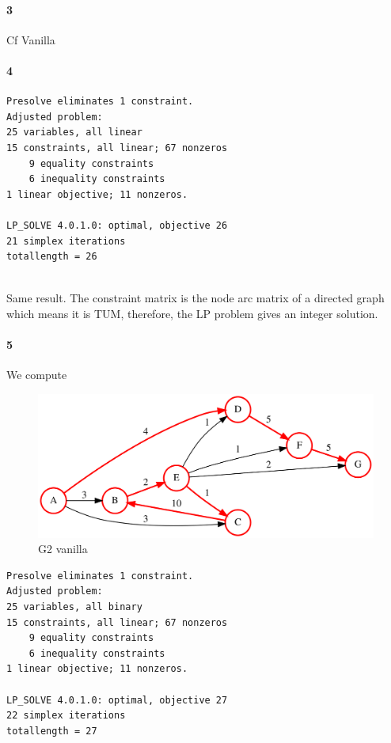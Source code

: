 \documentclass{article}
\begin{document}
\paragraph{3}

Cf Vanilla

\paragraph{4}

\begin{lstlisting}
Presolve eliminates 1 constraint.
Adjusted problem:
25 variables, all linear
15 constraints, all linear; 67 nonzeros
	9 equality constraints
	6 inequality constraints
1 linear objective; 11 nonzeros.

LP_SOLVE 4.0.1.0: optimal, objective 26
21 simplex iterations
totallength = 26
  
\end{lstlisting}

Same result. The constraint matrix is the node arc matrix of a directed graph which means it is TUM, therefore, the LP problem gives an integer solution.

\paragraph{5}

We compute

\begin{figure}[H]
  \centering
  \includegraphics[scale=0.3]{graph/vanilla_G2}
  \caption{G2 vanilla}
\end{figure}

\begin{lstlisting}
Presolve eliminates 1 constraint.
Adjusted problem:
25 variables, all binary
15 constraints, all linear; 67 nonzeros
	9 equality constraints
	6 inequality constraints
1 linear objective; 11 nonzeros.

LP_SOLVE 4.0.1.0: optimal, objective 27
22 simplex iterations
totallength = 27
  
\end{lstlisting}
\end{document}
